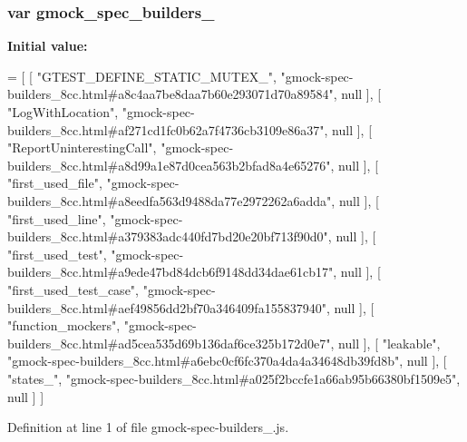 \subsubsection[{\texorpdfstring{gmock\+\_\+spec\+\_\+builders\+\_\+8cc}{gmock_spec_builders_8cc}}]{\setlength{\rightskip}{0pt plus 5cm}var gmock\+\_\+spec\+\_\+builders\+\_}\hypertarget{gmock-spec-builders__8cc_8js_ae2562376dcebccc510b25abc6a50dc48}{}\label{gmock-spec-builders__8cc_8js_ae2562376dcebccc510b25abc6a50dc48}
{\bfseries Initial value\+:}
\begin{DoxyCode}
=
[
    [ \textcolor{stringliteral}{"GTEST\_DEFINE\_STATIC\_MUTEX\_"}, \textcolor{stringliteral}{"gmock-spec-builders\_8cc.html#a8c4aa7be8daa7b60e293071d70a89584"}, null 
      ],
    [ \textcolor{stringliteral}{"LogWithLocation"}, \textcolor{stringliteral}{"gmock-spec-builders\_8cc.html#af271cd1fc0b62a7f4736cb3109e86a37"}, null ],
    [ \textcolor{stringliteral}{"ReportUninterestingCall"}, \textcolor{stringliteral}{"gmock-spec-builders\_8cc.html#a8d99a1e87d0cea563b2bfad8a4e65276"}, null ],
    [ \textcolor{stringliteral}{"first\_used\_file"}, \textcolor{stringliteral}{"gmock-spec-builders\_8cc.html#a8eedfa563d9488da77e2972262a6adda"}, null ],
    [ \textcolor{stringliteral}{"first\_used\_line"}, \textcolor{stringliteral}{"gmock-spec-builders\_8cc.html#a379383adc440fd7bd20e20bf713f90d0"}, null ],
    [ \textcolor{stringliteral}{"first\_used\_test"}, \textcolor{stringliteral}{"gmock-spec-builders\_8cc.html#a9ede47bd84dcb6f9148dd34dae61cb17"}, null ],
    [ \textcolor{stringliteral}{"first\_used\_test\_case"}, \textcolor{stringliteral}{"gmock-spec-builders\_8cc.html#aef49856dd2bf70a346409fa155837940"}, null ],
    [ \textcolor{stringliteral}{"function\_mockers"}, \textcolor{stringliteral}{"gmock-spec-builders\_8cc.html#ad5cea535d69b136daf6ce325b172d0e7"}, null ],
    [ \textcolor{stringliteral}{"leakable"}, \textcolor{stringliteral}{"gmock-spec-builders\_8cc.html#a6ebc0cf6fc370a4da4a34648db39fd8b"}, null ],
    [ \textcolor{stringliteral}{"states\_"}, \textcolor{stringliteral}{"gmock-spec-builders\_8cc.html#a025f2bccfe1a66ab95b66380bf1509e5"}, null ]
]
\end{DoxyCode}


Definition at line 1 of file gmock-\/spec-\/builders\+\_.\+js.

